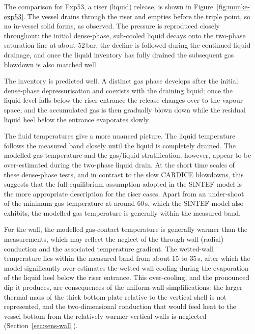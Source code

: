 \documentclass[5p,authoryear]{elsarticle}
\begin{document}
The comparison for Exp53, a riser (liquid) release, is shown in Figure~\ref{fig:munke-exp53}. The
vessel drains through the riser and empties before the triple point, so no in-vessel solid forms, as
observed. The pressure is reproduced closely throughout: the initial dense-phase, sub-cooled liquid
decays onto the two-phase saturation line at about 52\,bar, the decline is followed during the
continued liquid drainage, and once the liquid inventory has fully drained the subsequent gas
blowdown is also matched well.

The inventory is predicted well. A distinct gas phase develops after the initial dense-phase
depressurisation and coexists with the draining liquid; once the liquid level falls below the riser
entrance the release changes over to the vapour space, and the accumulated gas is then gradually
blown down while the residual liquid heel below the entrance evaporates slowly.

The fluid temperatures give a more nuanced picture. The liquid temperature follows the measured band
closely until the liquid is completely drained. The modelled gas temperature and the gas/liquid
stratification, however, appear to be over-estimated during the two-phase liquid drain. At the short
time scales of these dense-phase tests, and in contrast to the slow CARDICE blowdowns, this suggests
that the full-equilibrium assumption adopted in the SINTEF model is the more appropriate description
for the riser cases. Apart from an under-shoot of the minimum gas temperature at around 60\,s, which
the SINTEF model also exhibits, the modelled gas temperature is generally within the measured band.

For the wall, the modelled gas-contact temperature is generally warmer than the measurements, which
may reflect the neglect of the through-wall (radial) conduction and the associated temperature
gradient. The wetted-wall temperature lies within the measured band from about 15 to 35\,s, after
which the model significantly over-estimates the wetted-wall cooling during the evaporation of the
liquid heel below the riser entrance. This over-cooling, and the pronounced dip it produces, are
consequences of the uniform-wall simplifications: the larger thermal mass of the thick bottom plate
relative to the vertical shell is not represented, and the two-dimensional conduction that would
feed heat to the vessel bottom from the relatively warmer vertical walls is neglected
(Section~\ref{sec:sens-wall}).

\end{document}
